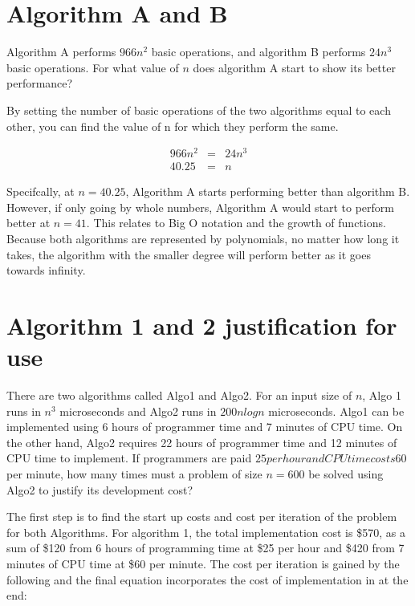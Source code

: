 \documentclass[11pt]{article}
\begin{document}
\section{Algorithm A and B}
Algorithm A performs $966n^2$ basic operations, and algorithm B performs $24n^3$ basic operations. For what value of $n$ does algorithm A start to show its better performance?

\bigskip 

\bigskip

By setting the number of basic operations of the two algorithms equal to each other, you can find the value of n for which they perform the same.

\begin{eqnarray*}
966n^2 &=& 24n^3 \\
40.25 &=& n
\end{eqnarray*}

Specifcally, at $n=40.25$, Algorithm A starts performing better than algorithm B. However, if only going by whole numbers, Algorithm A would start to perform better at $n=41$. This relates to Big O notation and the growth of functions. Because both algorithms are represented by polynomials, no matter how long it takes, the algorithm with the smaller degree will perform better as it goes towards infinity.


\section{Algorithm 1 and 2 justification for use}
There are two algorithms called Algo1 and Algo2. For an input size of $n$, Algo 1 runs in $n^3$ microseconds and Algo2 runs in $200nlogn$ microseconds. Algo1 can be implemented using 6 hours of programmer time and 7 minutes of CPU time. On the other hand, Algo2 requires 22 hours of programmer time and 12 minutes of CPU time to implement. If programmers are paid $25 per hour and CPU time costs $60 per minute, how many times must a problem of size $n = 600$ be solved using Algo2 to justify its development cost? 

\bigskip 

\bigskip

The first step is to find the start up costs and cost per iteration of the problem for both Algorithms. For algorithm 1, the total implementation cost is \$570, as a sum of \$120 from 6 hours of programming time at \$25 per hour and \$420 from 7 minutes of CPU time at \$60 per minute. The cost per iteration is gained by the following and the final equation incorporates the cost of implementation in at the end:
\end{document}
